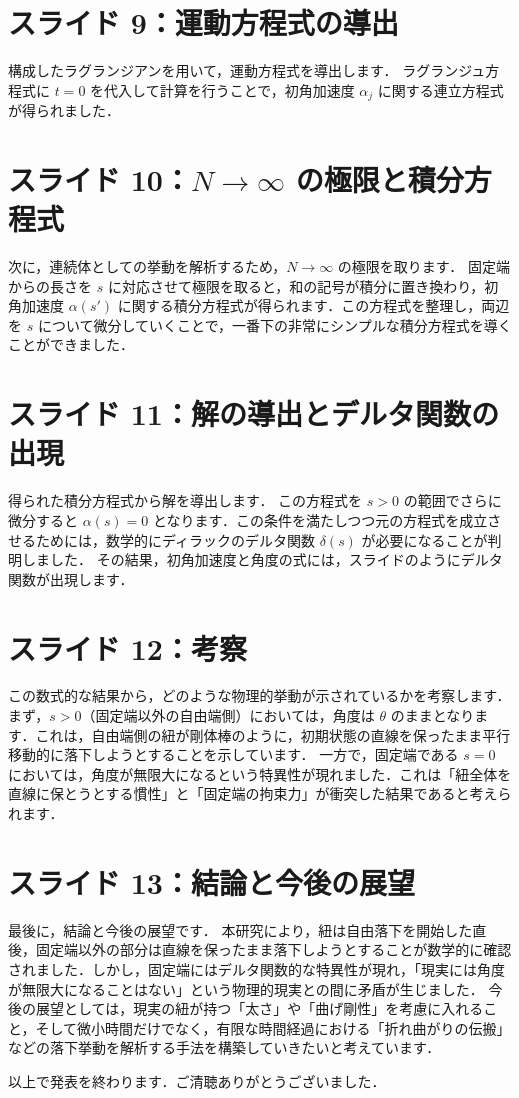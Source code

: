 \documentclass[9pt, twocolumn, a4paper]{ltjsarticle}
\begin{document}
\section{スライド 9：運動方程式の導出}
構成したラグランジアンを用いて，運動方程式を導出します．
ラグランジュ方程式に $t=0$ を代入して計算を行うことで，初角加速度 $\alpha_j$ に関する連立方程式が得られました．

\section{スライド 10：$N \to \infty$ の極限と積分方程式}
次に，連続体としての挙動を解析するため，$N \to \infty$ の極限を取ります．
固定端からの長さを $s$ に対応させて極限を取ると，和の記号が積分に置き換わり，初角加速度 $\alpha(s')$ に関する積分方程式が得られます．この方程式を整理し，両辺を $s$ について微分していくことで，一番下の非常にシンプルな積分方程式を導くことができました．

\section{スライド 11：解の導出とデルタ関数の出現}
得られた積分方程式から解を導出します．
この方程式を $s > 0$ の範囲でさらに微分すると $\alpha(s) = 0$ となります．この条件を満たしつつ元の方程式を成立させるためには，数学的にディラックのデルタ関数 $\delta(s)$ が必要になることが判明しました．
その結果，初角加速度と角度の式には，スライドのようにデルタ関数が出現します．

\section{スライド 12：考察}
この数式的な結果から，どのような物理的挙動が示されているかを考察します．
まず，$s > 0$（固定端以外の自由端側）においては，角度は $\theta$ のままとなります．これは，自由端側の紐が剛体棒のように，初期状態の直線を保ったまま平行移動的に落下しようとすることを示しています．
一方で，固定端である $s = 0$ においては，角度が無限大になるという特異性が現れました．これは「紐全体を直線に保とうとする慣性」と「固定端の拘束力」が衝突した結果であると考えられます．

\section{スライド 13：結論と今後の展望}
最後に，結論と今後の展望です．
本研究により，紐は自由落下を開始した直後，固定端以外の部分は直線を保ったまま落下しようとすることが数学的に確認されました．しかし，固定端にはデルタ関数的な特異性が現れ，「現実には角度が無限大になることはない」という物理的現実との間に矛盾が生じました．
今後の展望としては，現実の紐が持つ「太さ」や「曲げ剛性」を考慮に入れること，そして微小時間だけでなく，有限な時間経過における「折れ曲がりの伝搬」などの落下挙動を解析する手法を構築していきたいと考えています．

以上で発表を終わります．ご清聴ありがとうございました．
\end{document}
